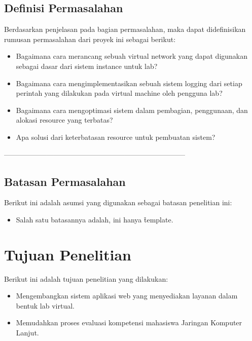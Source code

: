 \subsection{Definisi Permasalahan}
\label{sec:definisiMasalah}
Berdasarkan penjelasan pada bagian permasalahan, maka dapat didefinisikan rumusan permasalahan dari proyek ini sebagai berikut:
\begin{itemize}
	\item Bagaimana cara merancang sebuah virtual network yang dapat digunakan sebagai dasar dari sistem instance untuk lab?
	\item Bagaimana cara mengimplementasikan sebuah sistem logging dari setiap perintah yang dilakukan pada virtual machine oleh pengguna lab?
	\item Bagaimana cara mengoptimasi sistem dalam pembagian, penggunaan, dan alokasi resource yang terbatas?
	\item Apa solusi dari keterbatasan resource untuk pembuatan sistem?
\end{itemize}
-----------------------------------------------------------------------------%
\subsection{Batasan Permasalahan}
\label{sec:batasanMasalah}
Berikut ini adalah asumsi yang digunakan sebagai batasan penelitian ini:
\begin{itemize}
	\item Salah satu batasannya adalah, ini hanya \f{template}.
\end{itemize}

\noindent{}


\section{Tujuan Penelitian}
\label{sec:tujuan}
Berikut ini adalah tujuan penelitian yang dilakukan:
\begin{itemize}
	\item Mengembangkan sistem aplikasi web yang menyediakan layanan dalam bentuk lab virtual.
	\item Memudahkan proses evaluasi kompetensi mahasiswa Jaringan Komputer Lanjut.
\end{itemize}


